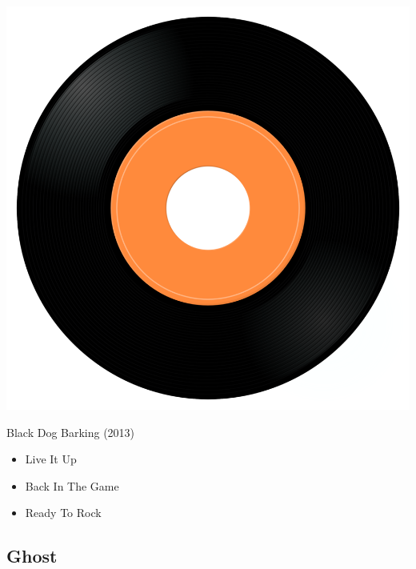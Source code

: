\begin{minipage}[t]{0.25\textwidth}
\captionsetup{type=figure}
\includegraphics[width=\textwidth]{Images/cover.png}
\caption*{Black Dog Barking (2013)}
\end{minipage}
\begin{minipage}[t]{0.25\textwidth}\vspace{0pt}
\begin{itemize}[nosep,leftmargin=1em,labelwidth=*,align=left]
	\setlength{\itemsep}{0pt}
	\item Live It Up
	\item Back In The Game
	\item Ready To Rock
\end{itemize}
\end{minipage}

\subsection{Ghost}

